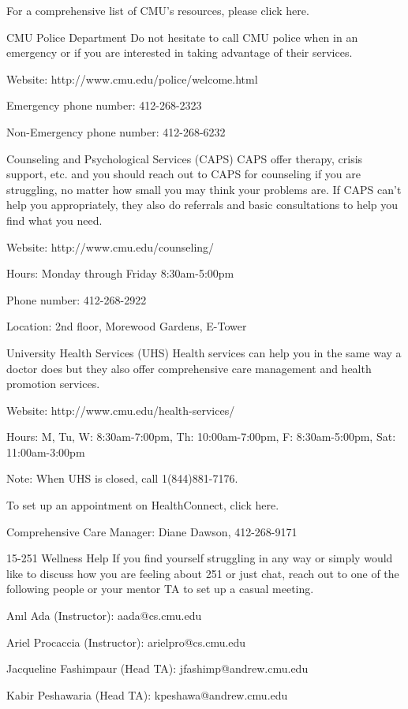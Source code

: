 For a comprehensive list of CMU’s resources, please click here.

 
CMU Police Department
Do not hesitate to call CMU police when in an emergency or if you are interested in taking advantage of their services.

Website: http://www.cmu.edu/police/welcome.html

Emergency phone number: 412-268-2323

Non-Emergency phone number: 412-268-6232

 
Counseling and Psychological Services (CAPS)
CAPS offer therapy, crisis support, etc. and you should reach out to CAPS for counseling if you are struggling, no matter how small you may think your problems are. If CAPS can’t help you appropriately, they also do referrals and basic consultations to help you find what you need.

Website: http://www.cmu.edu/counseling/

Hours: Monday through Friday 8:30am-5:00pm

Phone number: 412-268-2922

Location: 2nd floor, Morewood Gardens, E-Tower

 
University Health Services (UHS)
Health services can help you in the same way a doctor does but they also offer comprehensive care management and health promotion services.

Website: http://www.cmu.edu/health-services/

Hours: M, Tu, W: 8:30am-7:00pm, Th: 10:00am-7:00pm, F: 8:30am-5:00pm, Sat: 11:00am-3:00pm

Note: When UHS is closed, call 1(844)881-7176.

To set up an appointment on HealthConnect, click here.

Comprehensive Care Manager: Diane Dawson, 412-268-9171

 
15-251 Wellness Help
If you find yourself struggling in any way or simply would like to discuss how you are feeling about 251 or just chat, reach out to one of the following people or your mentor TA to set up a casual meeting.

Anıl Ada (Instructor): aada@cs.cmu.edu

Ariel Procaccia (Instructor): arielpro@cs.cmu.edu

Jacqueline Fashimpaur (Head TA): jfashimp@andrew.cmu.edu

Kabir Peshawaria (Head TA): kpeshawa@andrew.cmu.edu
